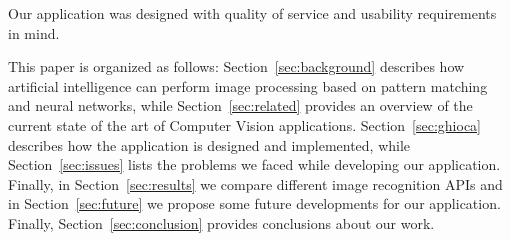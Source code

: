Our application was designed with quality of service and usability 
requirements in mind. 

This paper is organized as follows: Section~\ref{sec:background} describes how 
artificial intelligence can perform image processing based on pattern matching 
and neural networks, while Section~\ref{sec:related} provides an overview of 
the current state of the art of Computer Vision applications. 
Section~\ref{sec:ghioca} describes how the application is designed and 
implemented, while Section~\ref{sec:issues} lists the problems we faced while 
developing our application. Finally, in Section~\ref{sec:results} we compare 
different image recognition APIs and in Section~\ref{sec:future} we propose 
some future developments for our application. Finally, 
Section~\ref{sec:conclusion} provides conclusions about our work.